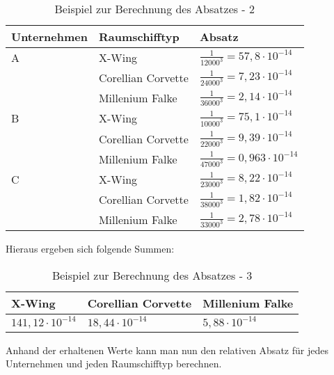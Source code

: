 \begin{table}[htb]
     \centering
     \begin{tabular}{ | l | l | l | }
          \hline
          Unternehmen & Raumschifftyp & Absatz \\
          \hline \hline
         A & X-Wing & $\frac{1}{12000^3} = 57,8 \cdot 10^{-14}$  \\
           & Corellian Corvette & $\frac{1}{24000^3} = 7,23 \cdot 10^{-14}$ \\
           & Millenium Falke & $\frac{1}{36000^3} = 2,14 \cdot 10^{-14}$ \\ \hline
         B & X-Wing & $\frac{1}{10000^3} = 75,1 \cdot 10^{-14}$ \\
           & Corellian Corvette & $\frac{1}{22000^3} = 9,39 \cdot 10^{-14}$ \\
           & Millenium Falke & $\frac{1}{47000^3} = 0,963 \cdot 10^{-14}$ \\ \hline
         C & X-Wing & $\frac{1}{23000^3} = 8,22 \cdot 10^{-14}$ \\
           & Corellian Corvette & $\frac{1}{38000^3} = 1,82 \cdot 10^{-14}$ \\
           & Millenium Falke & $\frac{1}{33000^3} = 2,78 \cdot 10^{-14}$ \\ \hline
     \end{tabular}
     \caption{Beispiel zur Berechnung des Absatzes - 2}
     \label{tab:spielwelt-logik-absatzmengen-beispiel2}
\end{table}
 
 Hieraus ergeben sich folgende Summen:
 
\begin{table}[htb]
     \centering
     \begin{tabular}{ | l | l | l | }
          \hline
          X-Wing & Corellian Corvette & Millenium Falke \\
          \hline \hline
          $141,12 \cdot 10^{-14}$ & $18,44 \cdot 10^{-14}$ &  $5,88 \cdot 10^{-14}$ \\ \hline
          
     \end{tabular}
     \caption{Beispiel zur Berechnung des Absatzes - 3}
     \label{tab:spielwelt-logik-absatzmengen-beispiel3}
\end{table} 

Anhand der erhaltenen Werte kann man nun den relativen Absatz für jedes Unternehmen und jeden Raumschifftyp berechnen.


